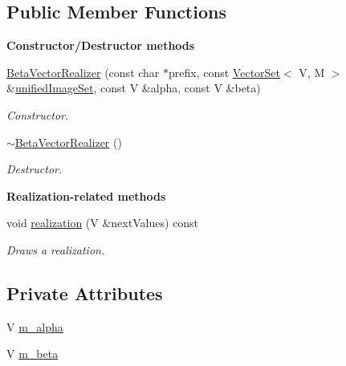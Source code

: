 \subsection*{Public Member Functions}
\begin{Indent}{\bf Constructor/\-Destructor methods}\par
\begin{DoxyCompactItemize}
\item 
\hyperlink{class_q_u_e_s_o_1_1_beta_vector_realizer_a476e76c89f2f6706989943596d9158ae}{Beta\-Vector\-Realizer} (const char $\ast$prefix, const \hyperlink{class_q_u_e_s_o_1_1_vector_set}{Vector\-Set}$<$ V, M $>$ \&\hyperlink{class_q_u_e_s_o_1_1_base_vector_realizer_ad958991bab8d6369e8a0d66b22a237d4}{unified\-Image\-Set}, const V \&alpha, const V \&beta)
\begin{DoxyCompactList}\small\item\em Constructor. \end{DoxyCompactList}\item 
\hyperlink{class_q_u_e_s_o_1_1_beta_vector_realizer_aaa4a00655b79a138fa28cea29a91a91f}{$\sim$\-Beta\-Vector\-Realizer} ()
\begin{DoxyCompactList}\small\item\em Destructor. \end{DoxyCompactList}\end{DoxyCompactItemize}
\end{Indent}
\begin{Indent}{\bf Realization-\/related methods}\par
\begin{DoxyCompactItemize}
\item 
void \hyperlink{class_q_u_e_s_o_1_1_beta_vector_realizer_a75659aac16145ad3e770e852500ee7f2}{realization} (V \&next\-Values) const 
\begin{DoxyCompactList}\small\item\em Draws a realization. \end{DoxyCompactList}\end{DoxyCompactItemize}
\end{Indent}
\subsection*{Private Attributes}
\begin{DoxyCompactItemize}
\item 
V \hyperlink{class_q_u_e_s_o_1_1_beta_vector_realizer_a9a1570ec745b892fafe325605a2dcb57}{m\-\_\-alpha}
\item 
V \hyperlink{class_q_u_e_s_o_1_1_beta_vector_realizer_a0f2c801dbb06b1a5e41817fb66d3d952}{m\-\_\-beta}
\end{DoxyCompactItemize}
